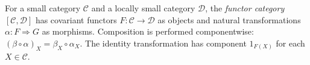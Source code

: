 
For a small category $\mathcal C$ and a locally small category $\mathcal D$, the \emph{functor category} $[\mathcal C,\mathcal D]$ has covariant functors $F:\mathcal C\to\mathcal D$ as objects and natural transformations $\alpha:F\Rightarrow G$ as morphisms. Composition is performed componentwise: $(\beta\circ\alpha)_X=\beta_X\circ\alpha_X$. The identity transformation has component $1_{F(X)}$ for each $X\in\mathcal C$.
